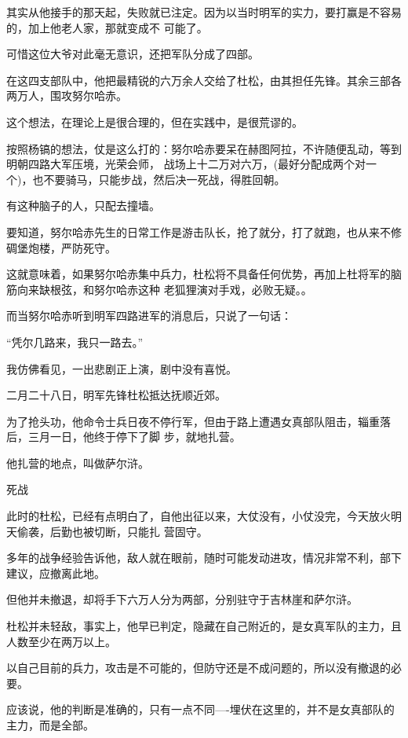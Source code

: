 \documentclass[11pt,a4paper,onecolumn]{article}
\begin{document}
其实从他接手的那天起，失败就已注定。因为以当时明军的实力，要打赢是不容易的，加上他老人家，那就变成不
可能了。

可惜这位大爷对此毫无意识，还把军队分成了四部。

在这四支部队中，他把最精锐的六万余人交给了杜松，由其担任先锋。其余三部各两万人，围攻努尔哈赤。

这个想法，在理论上是很合理的，但在实践中，是很荒谬的。

按照杨镐的想法，仗是这么打的：努尔哈赤要呆在赫图阿拉，不许随便乱动，等到明朝四路大军压境，光荣会师，
战场上十二万对六万，(最好分配成两个对一个)，也不要骑马，只能步战，然后决一死战，得胜回朝。

有这种脑子的人，只配去撞墙。

要知道，努尔哈赤先生的日常工作是游击队长，抢了就分，打了就跑，也从来不修碉堡炮楼，严防死守。

这就意味着，如果努尔哈赤集中兵力，杜松将不具备任何优势，再加上杜将军的脑筋向来缺根弦，和努尔哈赤这种
老狐狸演对手戏，必败无疑。。

而当努尔哈赤听到明军四路进军的消息后，只说了一句话：

``凭尔几路来，我只一路去。''

我仿佛看见，一出悲剧正上演，剧中没有喜悦。

二月二十八日，明军先锋杜松抵达抚顺近郊。

为了抢头功，他命令士兵日夜不停行军，但由于路上遭遇女真部队阻击，辎重落后，三月一日，他终于停下了脚
步，就地扎营。

他扎营的地点，叫做萨尔浒。

死战

此时的杜松，已经有点明白了，自他出征以来，大仗没有，小仗没完，今天放火明天偷袭，后勤也被切断，只能扎
营固守。

多年的战争经验告诉他，敌人就在眼前，随时可能发动进攻，情况非常不利，部下建议，应撤离此地。

但他并未撤退，却将手下六万人分为两部，分别驻守于吉林崖和萨尔浒。

杜松并未轻敌，事实上，他早已判定，隐藏在自己附近的，是女真军队的主力，且人数至少在两万以上。

以自己目前的兵力，攻击是不可能的，但防守还是不成问题的，所以没有撤退的必要。

应该说，他的判断是准确的，只有一点不同----埋伏在这里的，并不是女真部队的主力，而是全部。

\section[\thesection]{}
\end{document}
